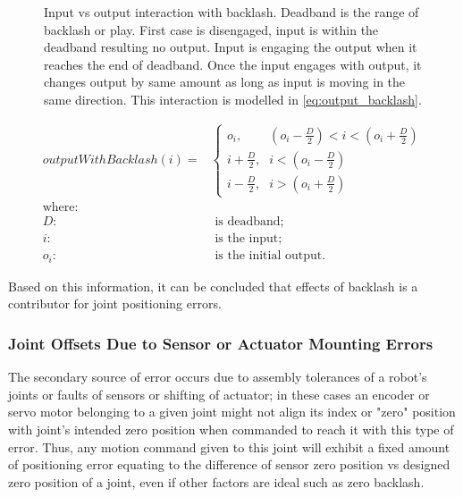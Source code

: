 \documentclass[english, printversion, nomenclature, notitle]{tuvisionthesis} %
\begin{document}
\begin{figure}
	\def\svgwidth{\linewidth}
	
	\caption[Input vs output interaction with backlash.]{Input vs output interaction with backlash. Deadband is the range of backlash or play. First case is disengaged, input is within the deadband resulting no output. Input is engaging the output when it reaches the end of deadband. Once the input engages with output, it changes output by same amount as long as input is moving in the same direction. This interaction is modelled in \cref{eq:output_backlash}.}
	\label{fig:backlash}
\end{figure}

\begin{equation}
\begin{aligned}
outputWithBacklash(i) =& \begin{cases}
\mbox{$o_i$,} & (o_i - \frac{D}{2}) < i < (o_i + \frac{D}{2}) \\
\mbox{$i + \frac{D}{2}$,} & i < (o_i - \frac{D}{2}) \\
\mbox{$i - \frac{D}{2}$,} & i > (o_i + \frac{D}{2})
\end{cases}\\
\text{where:}&\\
D : & \text{ is deadband};\\
i : & \text{ is the input};\\
o_i : & \text{ is the initial output.}
\end{aligned}
\label{eq:output_backlash}
\end{equation}

Based on this information, it can be concluded that effects of backlash is a contributor for joint positioning errors.

\subsubsection{Joint Offsets Due to Sensor or Actuator Mounting Errors}

The secondary source of error occurs due to assembly tolerances of a robot's joints or faults of sensors or shifting of actuator; in these cases an encoder or servo motor belonging to a given joint might not align its index or "zero" position with joint's intended zero position when commanded to reach it with this type of error. Thus, any motion command given to this joint will exhibit a fixed amount of positioning error equating to the difference of sensor zero position vs designed zero position of a joint, even if other factors are ideal such as zero backlash.
\end{document}
